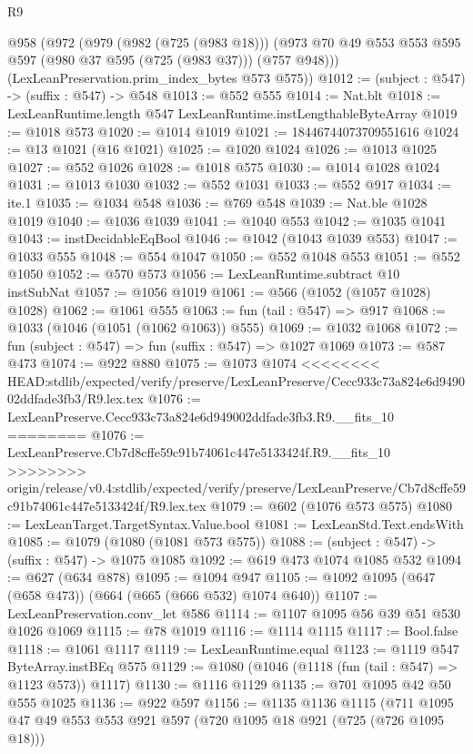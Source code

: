 \begin{lexlean}{R9}
\begin{coremodule}
{{{{{{{{{{{{{{{{{{{{{  @958
    (@972
      (@979
        (@982 (@725 (@983 @18)))
        (@973 @70 @49 @553 @553 @595 @597 (@980 @37 @595 (@725 (@983 @37))) (@757 @948)))
      (LexLeanPreservation.prim_index_bytes @573 @575))
@1012 := (subject : @547) -> (suffix : @547) -> @548
@1013 := @552 @555
@1014 := Nat.blt
@1018 := LexLeanRuntime.length @547 LexLeanRuntime.instLengthableByteArray
@1019 := @1018 @573
@1020 := @1014 @1019
@1021 := 18446744073709551616
@1024 := @13 @1021 (@16 @1021)
@1025 := @1020 @1024
@1026 := @1013 @1025
@1027 := @552 @1026
@1028 := @1018 @575
@1030 := @1014 @1028 @1024
@1031 := @1013 @1030
@1032 := @552 @1031
@1033 := @552 @917
@1034 := ite.{1}
@1035 := @1034 @548
@1036 := @769 @548
@1039 := Nat.ble @1028 @1019
@1040 := @1036 @1039
@1041 := @1040 @553
@1042 := @1035 @1041
@1043 := instDecidableEqBool
@1046 := @1042 (@1043 @1039 @553)
@1047 := @1033 @555
@1048 := @554 @1047
@1050 := @552 @1048 @553
@1051 := @552 @1050
@1052 := @570 @573
@1056 := LexLeanRuntime.subtract @10 instSubNat
@1057 := @1056 @1019
@1061 := @566 (@1052 (@1057 @1028) @1028)
@1062 := @1061 @555
@1063 := fun (tail : @547) => @917
@1068 := @1033 (@1046 (@1051 (@1062 @1063)) @555)
@1069 := @1032 @1068
@1072 := fun (subject : @547) => fun (suffix : @547) => @1027 @1069
@1073 := @587 @473
@1074 := @922 @880
@1075 := @1073 @1074
<<<<<<<< HEAD:stdlib/expected/verify/preserve/LexLeanPreserve/Cecc933c73a824e6d949002ddfade3fb3/R9.lex.tex
@1076 := LexLeanPreserve.Cecc933c73a824e6d949002ddfade3fb3.R9.__fits_10
========
@1076 := LexLeanPreserve.Cb7d8cffe59c91b74061c447e5133424f.R9.__fits_10
>>>>>>>> origin/release/v0.4:stdlib/expected/verify/preserve/LexLeanPreserve/Cb7d8cffe59c91b74061c447e5133424f/R9.lex.tex
@1079 := @602 (@1076 @573 @575)
@1080 := LexLeanTarget.TargetSyntax.Value.bool
@1081 := LexLeanStd.Text.endsWith
@1085 := @1079 (@1080 (@1081 @573 @575))
@1088 := (subject : @547) -> (suffix : @547) -> @1075 @1085
@1092 := @619 @473 @1074 @1085 @532
@1094 := @627 (@634 @878)
@1095 := @1094 @947
@1105 := @1092 @1095 (@647 (@658 @473)) (@664 (@665 (@666 @532) @1074 @640))
@1107 := LexLeanPreservation.conv_let @586
@1114 := @1107 @1095 @56 @39 @51 @530 @1026 @1069
@1115 := @78 @1019
@1116 := @1114 @1115
@1117 := Bool.false
@1118 := @1061 @1117
@1119 := LexLeanRuntime.equal
@1123 := @1119 @547 ByteArray.instBEq @575
@1129 := @1080 (@1046 (@1118 (fun (tail : @547) => @1123 @573)) @1117)
@1130 := @1116 @1129
@1135 := @701 @1095 @42 @50 @555 @1025
@1136 := @922 @597
@1156 := @1135
    @1136
    @1115
    (@711
      @1095
      @47
      @49
      @553
      @553
      @921
      @597
      (@720 @1095 @18 @921 (@725 (@726 @1095 @18)))
}}}}}}}}}}}}}}}}}}}}}
\end{coremodule}
\end{lexlean}
